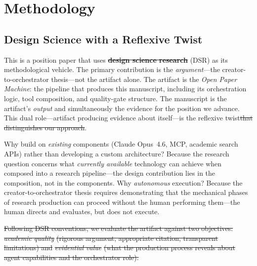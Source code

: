 \documentclass{article}
\providecommand{\DIFaddtex}[1]{{\protect\color{blue}\uwave{#1}}} %
\providecommand{\DIFdeltex}[1]{{\protect\color{red}\sout{#1}}}                      %
\providecommand{\DIFaddbegin}{} %
\providecommand{\DIFaddend}{} %
\providecommand{\DIFdelbegin}{} %
\providecommand{\DIFdelend}{} %
\providecommand{\DIFadd}[1]{\texorpdfstring{\DIFaddtex{#1}}{#1}} %
\providecommand{\DIFdel}[1]{\texorpdfstring{\DIFdeltex{#1}}{}} %
\newcommand{\DIFscaledelfig}{0.5}
\newlength{\DIFdelgraphicswidth} %
\newlength{\DIFdelgraphicsheight} %
\newcommand{\DIFaddincludegraphics}[2][]{{\color{blue}\fbox{\DIFOincludegraphics[#1]{#2}}}} %
\newcommand{\DIFdelincludegraphics}[2][]{%
\sbox{\DIFdelgraphicsbox}{\DIFOincludegraphics[#1]{#2}}%
\settoboxwidth{\DIFdelgraphicswidth}{\DIFdelgraphicsbox} %
\settoboxtotalheight{\DIFdelgraphicsheight}{\DIFdelgraphicsbox} %
\scalebox{\DIFscaledelfig}{%
\parbox[b]{\DIFdelgraphicswidth}{\usebox{\DIFdelgraphicsbox}\\[-\baselineskip] \rule{\DIFdelgraphicswidth}{0em}}\llap{\resizebox{\DIFdelgraphicswidth}{\DIFdelgraphicsheight}{%
\setlength{\unitlength}{\DIFdelgraphicswidth}%
\begin{picture}(1,1)%
\thicklines\linethickness{2pt} %
{\color[rgb]{1,0,0}\put(0,0){\framebox(1,1){}}}%
{\color[rgb]{1,0,0}\put(0,0){\line( 1,1){1}}}%
{\color[rgb]{1,0,0}\put(0,1){\line(1,-1){1}}}%
\end{picture}%
}\hspace*{3pt}}} %
} %
\DeclareRobustCommand{\DIFaddbegin}{\DIFOaddbegin \let\includegraphics\DIFaddincludegraphics} %
\DeclareRobustCommand{\DIFaddend}{\DIFOaddend \let\includegraphics\DIFOincludegraphics} %
\DeclareRobustCommand{\DIFdelbegin}{\DIFOdelbegin \let\includegraphics\DIFdelincludegraphics} %
\DeclareRobustCommand{\DIFdelend}{\DIFOaddend \let\includegraphics\DIFOincludegraphics} %
\begin{document}
\DIFdelend %
\section{Methodology}
\label{sec:method}

\subsection{Design Science with a Reflexive Twist}

This is a position paper that uses \DIFdelbegin \textbf{\DIFdel{design science research}} %
\DIFdelend \DIFaddbegin \DIFadd{design science research }\DIFaddend (DSR) \citep{hevner2004design} as its methodological vehicle. The primary contribution is the \textit{argument}---the creator-to-orchestrator thesis---not the artifact alone. The artifact is the \textit{Open Paper Machine}: the pipeline that produces this manuscript, including its orchestration logic, tool composition, and quality-gate structure. The manuscript is the artifact's \textit{output} and simultaneously the evidence for the position we advance. This dual role---artifact producing evidence about itself---is the reflexive twist\DIFdelbegin \DIFdel{that distinguishes our approach}\DIFdelend .

Why build on \textit{existing} components (Claude Opus~4.6, MCP, academic search APIs) rather than developing a custom architecture? Because the research question concerns what \textit{currently available} technology can achieve when composed into a research pipeline---the design contribution lies in the composition, not in the components. Why \textit{autonomous} execution? Because the creator-to-orchestrator thesis requires demonstrating that the mechanical phases of research production can proceed without the human performing them---the human directs and evaluates, but does not execute.

\DIFdelbegin \DIFdel{Following DSR conventions, we evaluate the artifact against two objectives: }\textit{\DIFdel{academic quality}} %
\DIFdel{(rigorous argument, appropriate citation, transparent limitations) and }\textit{\DIFdel{evidential value}} %
\DIFdel{(what the production process reveals about agent capabilities and the orchestrator role).
}%
\end{document}
